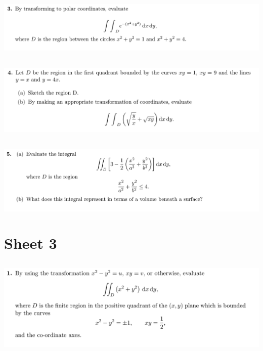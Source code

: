 \subsection{}
\begin{mdframed}
  \includegraphics[width=400pt]{img/oxford-prelims-M5-multivariable-calc-2-3.png}
\end{mdframed}

\subsection{}
\begin{mdframed}
  \includegraphics[width=400pt]{img/oxford-prelims-M5-multivariable-calc-2-4.png}
\end{mdframed}

\subsection{}
\begin{mdframed}
  \includegraphics[width=400pt]{img/oxford-prelims-M5-multivariable-calc-2-5.png}
\end{mdframed}



\newpage
\section{Sheet 3}


\subsection{}
\begin{mdframed}
  \includegraphics[width=400pt]{img/oxford-prelims-M5-multivariable-calc-3-1.png}
\end{mdframed}

